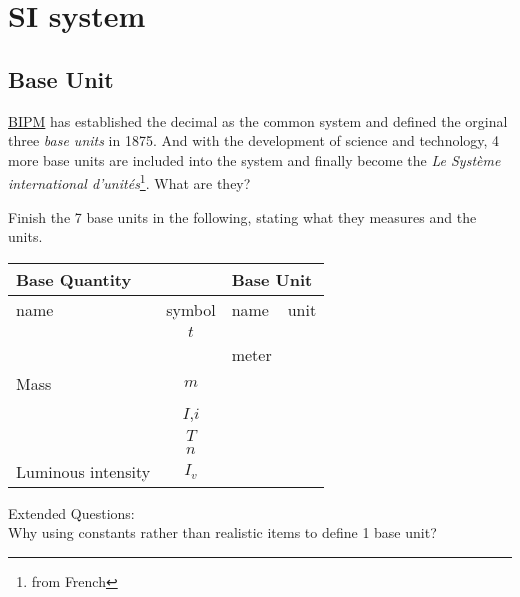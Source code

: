 \documentclass[12pt,a4paper]{tufte-handout}
\newenvironment{TaskBox} %
{\begin{tcolorbox}[breakable,colback=b1!30,colframe=b1,title=Task]} {\end{tcolorbox}}
\begin{document}
\section{SI system}
\subsection*{Base Unit}
\href{https://www.bipm.org/en/measurement-units}{BIPM} has established the decimal as the common system and defined the orginal three \emph{base units} in 1875. And with the development of science and technology, 4 more base units are included into the system and finally become the \emph{Le Système international d’unités}\footnote{from French}. What are they?
\begin{TaskBox}
Finish the 7 base units in the following, stating what they measures and the units.
\begin{table}
\centering
\begin{tabular}{|l|c|l|c|}
\hline
\multicolumn{2}{|l|}{Base Quantity}   & \multicolumn{2}{l|}{Base Unit} \\ \hline
name                      & symbol    & name             & unit        \\ \hline
                      & $t$         &            &            \\ \hline
                    &  & meter            &           \\ \hline
Mass                      & $m$         &         &           \\ \hline
         & $I$,$i$      &            &           \\ \hline
 & $T$         &           &            \\ \hline
       & $n$         &             &          \\ \hline
Luminous intensity        & $I_v$      &           &           \\ \hline
\end{tabular}
\end{table}
\tcblower
Extended Questions:\\
Why using constants rather than realistic items to define 1 base unit?
\end{TaskBox}
\end{document}
